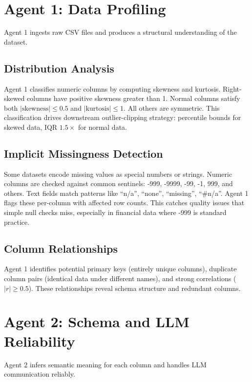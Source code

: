 \section{Agent 1: Data Profiling}

Agent 1 ingests raw CSV files and produces a structural understanding of the dataset.

\subsection{Distribution Analysis}

Agent 1 classifies numeric columns by computing skewness and kurtosis. Right-skewed columns have positive skewness greater than 1. Normal columns satisfy both $|\text{skewness}| \leq 0.5$ and $|\text{kurtosis}| \leq 1$. All others are symmetric. This classification drives downstream outlier-clipping strategy: percentile bounds for skewed data, IQR $1.5\times$ for normal data.

\subsection{Implicit Missingness Detection}

Some datasets encode missing values as special numbers or strings. Numeric columns are checked against common sentinels: -999, -9999, -99, -1, 999, and others. Text fields match patterns like ``n/a'', ``none'', ``missing'', ``#n/a''. Agent 1 flags these per-column with affected row counts. This catches quality issues that simple null checks miss, especially in financial data where -999 is standard practice.

\subsection{Column Relationships}

Agent 1 identifies potential primary keys (entirely unique columns), duplicate column pairs (identical data under different names), and strong correlations ($|r| \geq 0.5$). These relationships reveal schema structure and redundant columns.

\section{Agent 2: Schema and LLM Reliability}

Agent 2 infers semantic meaning for each column and handles LLM communication reliably.

